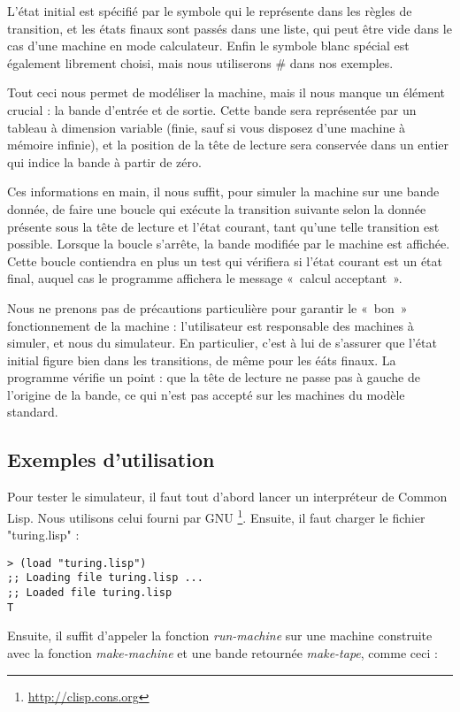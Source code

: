\documentclass[a4paper, 10pt]{article}
\begin{document}
L'état initial est spécifié par le symbole qui le représente dans les
règles de transition, et les états finaux sont passés dans une liste,
qui peut être vide dans le cas d'une machine en mode
calculateur. Enfin le symbole blanc spécial est également librement
choisi, mais nous utiliserons \# dans nos exemples.

Tout ceci nous permet de modéliser la machine, mais il nous manque un
élément crucial : la bande d'entrée et de sortie. Cette bande sera
représentée par un tableau à dimension variable (finie, sauf si vous
disposez d'une machine à mémoire infinie), et la position de la tête
de lecture sera conservée dans un entier qui indice la bande à partir
de zéro.

Ces informations en main, il nous suffit, pour simuler la machine sur
une bande donnée, de faire une boucle qui exécute la transition
suivante selon la donnée présente sous la tête de lecture et l'état
courant, tant qu'une telle transition est possible. Lorsque la boucle
s'arrête, la bande modifiée par le machine est affichée.
Cette boucle contiendra en plus un test qui vérifiera si l'état
courant est un état final, auquel cas le programme affichera le
message «~calcul acceptant~».

Nous ne prenons pas de précautions particulière pour garantir le
«~bon~» fonctionnement de la machine : l'utilisateur est responsable
des machines à simuler, et nous du simulateur. En particulier, c'est à
lui de s'assurer que l'état initial figure bien dans les transitions,
de même pour les éáts finaux. La programme vérifie un point : que la
tête de lecture ne passe pas à gauche de l'origine de la bande, ce qui
n'est pas accepté sur les machines du modèle standard.

\subsection*{Exemples d'utilisation}

Pour tester le simulateur, il faut tout d'abord lancer un interpréteur
de Common Lisp. Nous utilisons celui fourni par
GNU \footnote{\url{http://clisp.cons.org}}. Ensuite, il faut charger
le fichier "turing.lisp" :

\begin{lstlisting}
> (load "turing.lisp")
;; Loading file turing.lisp ...
;; Loaded file turing.lisp
T
\end{lstlisting}

Ensuite, il suffit d'appeler la fonction \textit{run-machine} sur une
machine construite avec la fonction \textit{make-machine} et une bande
retournée \textit{make-tape}, comme ceci :
\end{document}
